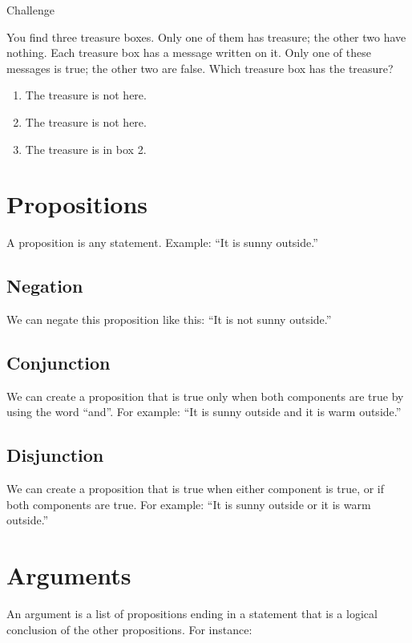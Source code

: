 \documentclass[a4paper,10pt]{report}
\begin{document}
\begin{problem}{Challenge}

You find three treasure boxes. Only one of them has treasure; the other two have
nothing. Each treasure box has a message written on it. Only one of these
messages is true; the other two are false. Which treasure box has the treasure?

\begin{enumerate}
\item The treasure is not here.
\item The treasure is not here.
\item The treasure is in box 2.
\end{enumerate}
\end{problem}

\section{Propositions}

A proposition is any statement. Example: ``It is sunny outside.''

\subsection{Negation}

We can negate this proposition like this: ``It is not sunny outside.''

\subsection{Conjunction}

We can create a proposition that is true only when both components are true by
using the word ``and''. For example: ``It is sunny outside and it is warm
outside.''

\subsection{Disjunction}

We can create a proposition that is true when either component is true, or if
both components are true. For example: ``It is sunny outside or it is warm
outside.''

\section{Arguments}

An argument is a list of propositions ending in a statement that is a logical
conclusion of the other propositions. For instance:
\end{document}
